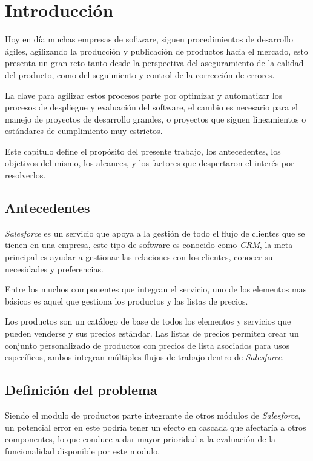 \chapter{Introducción}

Hoy en día muchas empresas de software, siguen procedimientos de desarrollo
ágiles, agilizando la producción y publicación de productos hacia el mercado,
esto presenta un gran reto tanto desde la perspectiva del aseguramiento de la
calidad del producto, como del seguimiento y control de la corrección de
errores.

La clave para agilizar estos procesos parte por optimizar y automatizar los
procesos de despliegue y evaluación del software, el cambio es necesario para
el manejo de proyectos de desarrollo grandes, o proyectos que siguen
lineamientos o estándares de cumplimiento muy estrictos.

Este capitulo define el propósito del presente trabajo, los antecedentes, los
objetivos del mismo, los alcances, y los factores que despertaron el interés
por resolverlos.

\section{Antecedentes}
\emph{Salesforce} es un servicio que apoya a la gestión de todo el flujo de
clientes que se tienen en una empresa, este tipo de software es  conocido como
\emph{CRM}, la meta principal es ayudar a gestionar las relaciones con los
clientes, conocer su necesidades y preferencias.

Entre los muchos componentes que integran el servicio, uno de los elementos mas
básicos es aquel que gestiona los productos y las listas de precios.

Los productos son un catálogo de base de todos los elementos y servicios que
pueden venderse y sus precios estándar. Las listas de precios permiten crear un
conjunto personalizado de productos con precios de lista asociados para usos
específicos, ambos integran múltiples flujos de trabajo dentro de
\emph{Salesforce}.

\section{Definición del problema}
Siendo el modulo de productos parte integrante de otros módulos de
\emph{Salesforce}, un potencial error en este podría tener un efecto en cascada
que afectaría a otros componentes, lo que conduce a dar mayor prioridad a la
evaluación de la funcionalidad disponible por este modulo.


